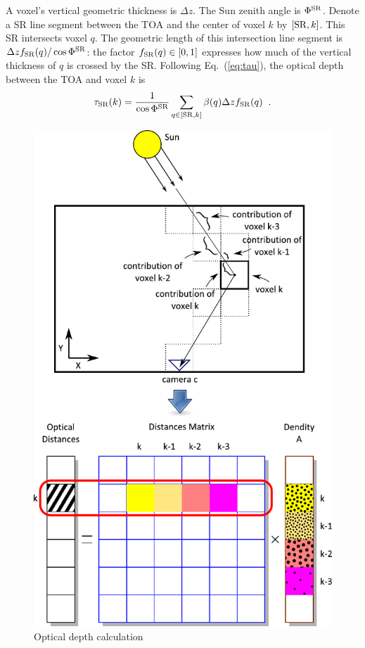 \documentclass[10pt,twocolumn,letterpaper]{article}
\begin{document}
A voxel's vertical geometric thickness is $\Delta z$.  The Sun zenith angle is $\Phi^{\rm SR}$.
Denote a SR line segment between the TOA and the center of voxel $k$ by $[{\rm SR},k]$.
This SR intersects voxel $q$. The geometric length of this intersection
line segment is $\Delta z f_{\rm SR}(q)/\cos\Phi^{\rm SR}$: the factor
$f_{\rm SR}(q)\in [0,1]$ expresses how much of the vertical thickness of $q$ is crossed by the SR.
Following Eq.~(\ref{eq:tau}), the optical depth between the TOA and voxel $k$ is
\begin{equation}
  \tau_{\rm SR}(k)=\frac{1}{\cos\Phi^{\rm SR}}
     \sum_{q \in[{\rm SR},k]}
     \beta(q)\Delta z  f_{\rm SR}(q)
  \;\;.
  \label{eq:lSRn}
\end{equation}
\begin{figure}
  \centering
    \includegraphics[width=\columnwidth]{images/optical_distance.pdf}
  \caption{Optical depth calculation}
  \label{fig:projection}
\end{figure}
\end{document}
